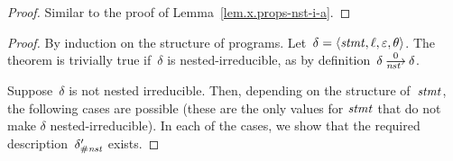 
\lemxpropsnstib*
\begin{proof}
  Similar to the proof of Lemma~\ref{lem.x.props-nst-i-a}.
\end{proof}


\propxsynrestloop*
{}


\propxsynrestfin*
{}


\thmxtermnstx*
\begin{proof}
  By induction on the structure of programs.
  Let~$\delta=\<\stmt,\ell,\nil,\theta>$.  The theorem is trivially true
  if~$\delta$ is nested-irreducible, as by definition~$\delta\nst[0]\delta$.

  Suppose~$\delta$ is not nested irreducible.  Then, depending on the
  structure of~$\mathit{stmt}$, the following cases are possible (these are the only
  values for $\mathit{stmt}$ that do not make $\delta$ nested-irreducible).  In each
  of the cases, we show that the required description~$\delta'_{\#\mathit{nst}}$
  exists.


\end{proof}

